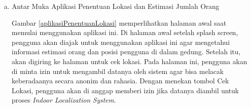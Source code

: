 \begin{enumerate}[a.]
	\item Antar Muka Aplikasi Penentuan Lokasi dan Estimasi Jumlah Orang

	      \par Gambar \ref*{aplikasiPenentuanLokasi} memperlihatkan halaman awal saat memulai menggunakan aplikasi ini. Di halaman awal setelah splash screen, pengguna akan diajak untuk menggunakan aplikasi ini agar mengetahui informasi estimasi orang dan posisi pengguna di dalam gedung. Setelah itu, akan digiring ke halaman untuk cek lokasi. Pada halaman ini, pengguna akan di minta izin untuk mengambil datanya oleh sistem agar bisa melacak keberadaanya secara anonim dan rahasia. Dengan menekan tombol Cek Lokasi, pengguna akan di anggap memberi izin jika datanya diambil untuk proses \textit{Indoor Localization System}.



\end{enumerate}
